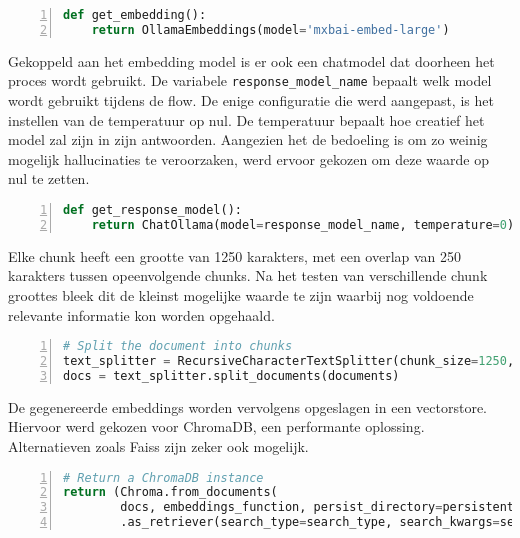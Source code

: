 \begin{lstlisting}[basicstyle=\small, frame=single, breaklines=true, postbreak=\mbox{\textcolor{red}{$\hookrightarrow$}\space}, escapeinside ={\%,}, escapechar={!}, numbers=left, language=Python, caption=Embedding model]
def get_embedding():
    return OllamaEmbeddings(model='mxbai-embed-large')
\end{lstlisting}

Gekoppeld aan het embedding model is er ook een chatmodel dat doorheen het proces wordt gebruikt. De variabele \verb|response_model_name| bepaalt welk model wordt gebruikt tijdens de flow. De enige configuratie die werd aangepast, is het instellen van de temperatuur op nul. De temperatuur bepaalt hoe creatief het model zal zijn in zijn antwoorden. Aangezien het de bedoeling is om zo weinig mogelijk hallucinaties te veroorzaken, werd ervoor gekozen om deze waarde op nul te zetten.

\begin{lstlisting}[basicstyle=\small, frame=single, breaklines=true, postbreak=\mbox{\textcolor{red}{$\hookrightarrow$}\space}, escapeinside ={\%,}, escapechar={!},
numbers=left, language=Python, caption=Chat model]
def get_response_model():
    return ChatOllama(model=response_model_name, temperature=0)
\end{lstlisting}



Elke chunk heeft een grootte van 1250 karakters, met een overlap van 250 karakters tussen opeenvolgende chunks. Na het testen van verschillende chunk groottes bleek dit de kleinst mogelijke waarde te zijn waarbij nog voldoende relevante informatie kon worden opgehaald.

\begin{lstlisting}[basicstyle=\small, frame=single, breaklines=true, postbreak=\mbox{\textcolor{red}{$\hookrightarrow$}\space}, escapeinside ={\%,}, escapechar={!}, numbers=left, language=Python, caption=Vector store build] 
# Split the document into chunks
text_splitter = RecursiveCharacterTextSplitter(chunk_size=1250, chunk_overlap=250)
docs = text_splitter.split_documents(documents)
\end{lstlisting}

De gegenereerde embeddings worden vervolgens opgeslagen in een vectorstore. Hiervoor werd gekozen voor ChromaDB, een performante oplossing. Alternatieven zoals Faiss zijn zeker ook mogelijk.

\begin{lstlisting}[basicstyle=\small, frame=single, breaklines=true, postbreak=\mbox{\textcolor{red}{$\hookrightarrow$}\space}, escapeinside ={\%,}, escapechar={!}, numbers=left, language=Python, caption=Vector store build]
# Return a ChromaDB instance
return (Chroma.from_documents(
        docs, embeddings_function, persist_directory=persistent_directory)
        .as_retriever(search_type=search_type, search_kwargs=search_kwargs))
\end{lstlisting}

